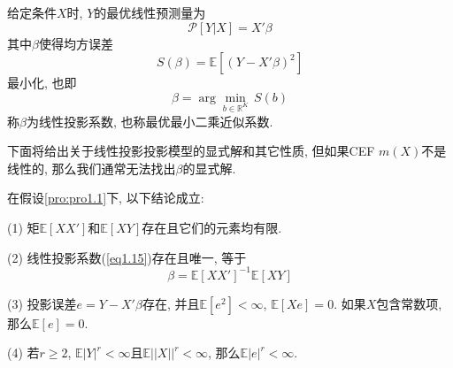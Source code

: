 \documentclass[cn, 12pt, math=mtpro2, bibstyle=apa, blue, twocol]{elegantbook}
\newcommand{\R}{\mathbb{R}}
\newcommand{\E}{\mathbb{E}}
\begin{document}
\begin{definition}
给定条件$X$时, $Y$的最优线性预测量为
$$\mathscr{P}[Y|X]=X'\beta$$
其中$\beta$使得均方误差
\begin{equation}\label{eq1.14}
  S(\beta)=\E[(Y-X'\beta)^2]
\end{equation}
最小化, 也即
\begin{equation}\label{eq1.15}
  \beta=\arg\min_{b\in\R^K}\,S(b)
\end{equation}
称$\beta$为线性投影系数, 也称最优最小二乘近似系数.
\end{definition}
下面将给出关于线性投影投影模型的显式解和其它性质, 但如果CEF $m(X)$不是线性的, 那么我们通常无法找出$\beta$的显式解.
\begin{theorem}\label{thm:thm1.5}
  在假设\ref{pro:pro1.1}下, 以下结论成立:

  (1) 矩$\E[XX']$和$\E[XY]$存在且它们的元素均有限.

  (2) 线性投影系数(\ref{eq1.15})存在且唯一, 等于
  $$\beta=\E[XX']^{-1}\E[XY]$$

  (3) 投影误差$e=Y-X'\beta$存在, 并且$\E[e^2]<\infty$, $\E[Xe]=0$. 如果$X$包含常数项, 那么$\E[e]=0$.

  (4) 若$r\geq2$, $\E|Y|^r<\infty$且$\E||X||^r<\infty$, 那么$\E|e|^r<\infty$.
\end{theorem}
\end{document}
